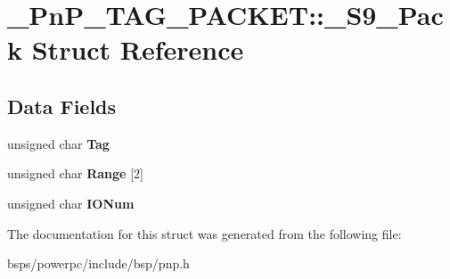 \hypertarget{struct__PnP__TAG__PACKET_1_1__S9__Pack}{}\section{\+\_\+\+Pn\+P\+\_\+\+T\+A\+G\+\_\+\+P\+A\+C\+K\+ET\+::\+\_\+\+S9\+\_\+\+Pack Struct Reference}
\label{struct__PnP__TAG__PACKET_1_1__S9__Pack}
\subsection*{Data Fields}
\begin{DoxyCompactItemize}
\item 
\mbox{\label{struct__PnP__TAG__PACKET_1_1__S9__Pack_a134e620ee0f4bdd8ca5a41a44bc170ea}} 
unsigned char {\bfseries Tag}
\item 
\mbox{\label{struct__PnP__TAG__PACKET_1_1__S9__Pack_ab6cbeaf8fc76fa98ecfe6d1bd70bc065}} 
unsigned char {\bfseries Range} \mbox{[}2\mbox{]}
\item 
\mbox{\label{struct__PnP__TAG__PACKET_1_1__S9__Pack_a5b3520b7c78cdf6f955bbdc863f115d2}} 
unsigned char {\bfseries I\+O\+Num}
\end{DoxyCompactItemize}


The documentation for this struct was generated from the following file\+:\begin{DoxyCompactItemize}
\item 
bsps/powerpc/include/bsp/pnp.\+h\end{DoxyCompactItemize}
